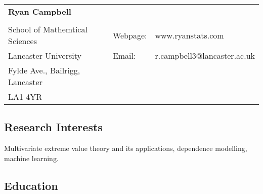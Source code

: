 \documentclass[11pt,]{scrartcl}
\begin{document}
\thispagestyle{firstpage}

\begin{table}[h]
{\def\arraystretch{1.1}\tabcolsep=0pt
\begin{tabular}{p{0.55\linewidth}p{0.05\linewidth}p{0.40\linewidth}}

  \multirow{1}{*}{\LARGE \textbf{Ryan Campbell}} &  &  \\
  
  & & \\
  
  School of Mathemtical Sciences & \multicolumn{1}{l}{Webpage:\;\;} & \multicolumn{1}{l}{www.ryanstats.com} \\
  
  Lancaster University & \multicolumn{1}{l}{Email:\;\;} &\multicolumn{1}{l}{r.campbell3@lancaster.ac.uk} \\
  
  Fylde Ave., Bailrigg, Lancaster & & \\ %
  
  LA1 4YR &  &  \\

\end{tabular}%
}
\end{table}

\subsection{Research Interests}\label{interests}
{Multivariate extreme value theory and its applications, dependence modelling, machine learning.}

\subsection{Education}\label{education}
\end{document}
